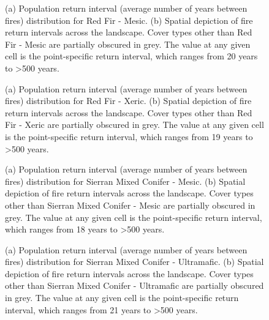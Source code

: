 \begin{figure}[!htbp]
  \centering
  \caption{(a) Population return interval (average number of years between fires) distribution for Red Fir - Mesic.  (b) Spatial depiction of fire return intervals across the landscape. Cover types other than Red Fir - Mesic are partially obscured in grey. The value at any given cell is the point-specific return interval, which ranges from 20 years to \textgreater 500 years.}
\label{fig:preturn_rfrm}
\end{figure}

\begin{figure}[!htbp]
  \centering
  \caption{(a) Population return interval (average number of years between fires) distribution for Red Fir - Xeric.  (b) Spatial depiction of fire return intervals across the landscape. Cover types other than Red Fir - Xeric are partially obscured in grey. The value at any given cell is the point-specific return interval, which ranges from 19 years to \textgreater 500 years.}
\label{fig:preturn_rfrx}
\end{figure}

\begin{figure}[!htbp]
  \centering
  \caption{(a) Population return interval (average number of years between fires) distribution for Sierran Mixed Conifer - Mesic.  (b) Spatial depiction of fire return intervals across the landscape. Cover types other than Sierran Mixed Conifer - Mesic are partially obscured in grey. The value at any given cell is the point-specific return interval, which ranges from 18 years to \textgreater 500 years.}
\label{fig:preturn_smcm_app}
\end{figure}

\begin{figure}[!htbp]
  \centering
  \caption{(a) Population return interval (average number of years between fires) distribution for Sierran Mixed Conifer - Ultramafic.  (b) Spatial depiction of fire return intervals across the landscape. Cover types other than Sierran Mixed Conifer - Ultramafic are partially obscured in grey. The value at any given cell is the point-specific return interval, which ranges from 21 years to \textgreater 500 years.}
\label{fig:preturn_smcu}
\end{figure}

